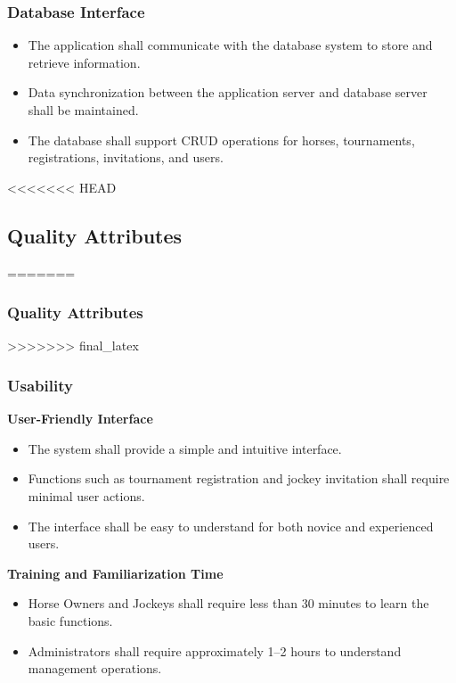 \subsubsection{Database Interface}

\begin{itemize}
    \item The application shall communicate with the database system to store and retrieve information.
    
    \item Data synchronization between the application server and database server shall be maintained.
    
    \item The database shall support CRUD operations for horses, tournaments, registrations, invitations, and users.
\end{itemize}


<<<<<<< HEAD
\subsection{Quality Attributes}
=======
\subsubsection{Quality Attributes}
>>>>>>> final_latex

\subsubsection{Usability}

\textbf{User-Friendly Interface}

\begin{itemize}
    \item The system shall provide a simple and intuitive interface.
    
    \item Functions such as tournament registration and jockey invitation shall require minimal user actions.
    
    \item The interface shall be easy to understand for both novice and experienced users.
\end{itemize}

\textbf{Training and Familiarization Time}

\begin{itemize}
    \item Horse Owners and Jockeys shall require less than 30 minutes to learn the basic functions.
    
    \item Administrators shall require approximately 1--2 hours to understand management operations.
\end{itemize}

